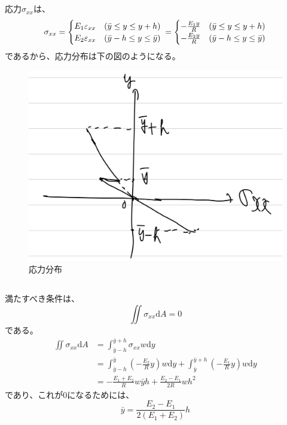 \documentclass[a4paper]{jsarticle}
\begin{document}
\subsection{}
応力$\sigma_{xx}$は、
\begin{equation}
  \sigma_{xx} = 
  \begin{cases}
    E_1 \varepsilon_{xx} & (\bar{y} \leq y \leq y + h) \\
    E_2 \varepsilon_{xx} & (\bar{y} - h \leq y \leq \bar{y})
  \end{cases} \\
  = 
  \begin{cases}
    -\frac{E_1 y}{R} & (\bar{y} \leq y \leq y + h) \\
    -\frac{E_2 y}{R} & (\bar{y} - h \leq y \leq \bar{y})
  \end{cases}
\end{equation}
であるから、応力分布は下の図のようになる。
\begin{figure}[hbt]
  \centering
  \includegraphics[width=0.5\hsize]{fig2.png}
  \caption{応力分布}
\end{figure}

\subsection{}
満たすべき条件は、
\begin{equation}
  \iint \sigma_{xx} \mathrm{d} A = 0 
\end{equation}
である。
\begin{equation}
  \begin{aligned}
    \iint \sigma_{xx} \mathrm{d} A &= 
    \int_{\bar{y} - h}^{\bar{y} + h} \sigma_{xx} w \mathrm{d} y \\
    &= \int_{\bar{y} - h}^{\bar{y}} \left(-\frac{E_2}{R} y \right) w \mathrm{d} y
    + \int_{\bar{y}}^{\bar{y} + h} \left(-\frac{E_1}{R} y \right) w \mathrm{d} y \\
    &= -\frac{E_1 + E_2}{R} w \bar{y} h + \frac{E_2 - E_1}{2 R} w h^2
  \end{aligned}
\end{equation}
であり、これが0になるためには、
\begin{equation}
  \bar{y} = \frac{E_2 - E_1}{2 (E_1 + E_2)} h
\end{equation}
\end{document}
